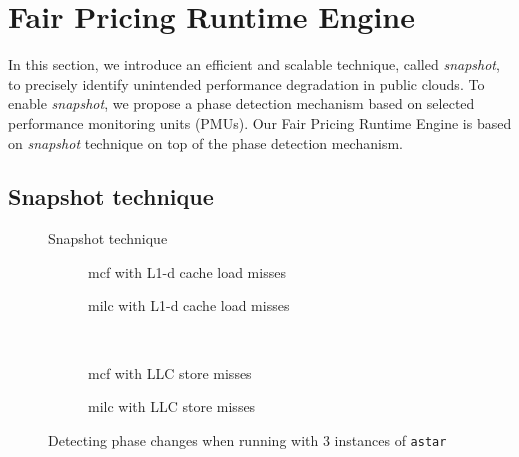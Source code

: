 \documentclass{sig-alternate}
\begin{document}
\section{Fair Pricing Runtime Engine}
\label{sec:FairPricingRuntimeEngine}

In this section, we introduce an efficient and scalable technique, called \textit{snapshot}, to precisely identify unintended performance degradation in public clouds. To enable \textit{snapshot}, we propose a phase detection mechanism based on selected performance monitoring units (PMUs). Our Fair Pricing Runtime Engine is based on \textit{snapshot} technique on top of the phase detection mechanism.
\subsection{Snapshot technique}
\label{subsec:Snapshottechnique}
\begin{figure}
\centering
\begin{minipage}[t]{1\columnwidth}
\centering
{}
\caption{Snapshot technique}
\label{fig:snapshot_shuttering}
\end{minipage}
\end{figure}
\begin{figure*}
\centering
\begin{subfigure}[t]{1\columnwidth}
\centering
{}
\caption{mcf with L1-d cache load misses}
\label{fig:mcfl1dastar}
\end{subfigure}
\hfill
\begin{subfigure}[t]{1\columnwidth}
\centering
{}
\caption{milc with L1-d cache load misses}
\label{fig:milcl1dastar}
\end{subfigure}
\hfill\\
\begin{subfigure}[t]{1\columnwidth}
\centering
{}
\caption{mcf with LLC store misses}
\label{fig:mcfllcastar}
\end{subfigure}
\hfill
\begin{subfigure}[t]{1\columnwidth}
\centering
{}
\caption{milc with LLC store misses}
\label{fig:milcllcastar}
\end{subfigure}
\caption{Detecting phase changes when running with 3 instances of \texttt{astar}}
\label{fig:PMUtypephase}
\end{figure*}
\end{document}
